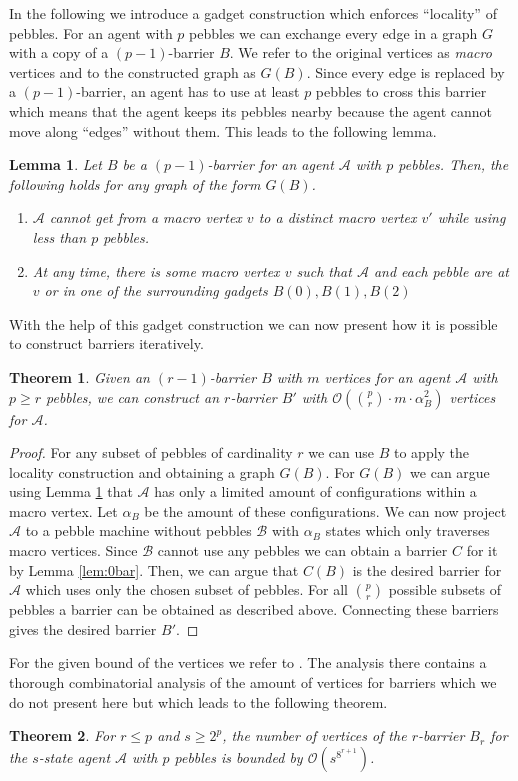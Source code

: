 \documentclass[oneside]{scrartcl}
\newtheorem{thm}{Theorem}
\newtheorem{lem}{Lemma}
\begin{document}
In the following we introduce a gadget construction which enforces
\enquote{locality} of pebbles. For an agent with $p$ pebbles we can exchange
every edge in a graph $G$ with a copy of a $(p-1)$-barrier $B$. We refer to the
original vertices as \emph{macro} vertices and to the constructed graph as
$G(B)$.  Since every edge is replaced by a $(p-1)$-barrier, an agent has to use
at least $p$ pebbles to cross this barrier which means that the agent keeps its
pebbles nearby because the agent cannot move along \enquote{edges} without
them. This leads to the following lemma.
\begin{lem}
  \label{lem:loc}
  Let $B$ be a $(p-1)$-barrier for an agent $\mathcal{A}$ with $p$ pebbles.
  Then, the following holds for any graph of the form $G(B)$.
  \begin{enumerate}
    \item $\mathcal{A}$ cannot get from a macro vertex $v$ to a distinct
      macro vertex $v'$ while using less than $p$ pebbles.
    \item At any time, there is some macro vertex $v$ such that $\mathcal{A}$
      and each pebble are at $v$ or in one of the surrounding gadgets $B(0),
      B(1), B(2)$
  \end{enumerate}
\end{lem}

With the help of this gadget construction we can now present how it is possible
to construct barriers iteratively.
\begin{thm}
  Given an $(r-1)$-barrier $B$ with $m$ vertices for an agent $\mathcal{A}$
  with $p\geq r$ pebbles, we can construct an $r$-barrier $B'$ with
  $\mathcal{O}({{p}\choose{r}}\cdot m\cdot \alpha_{B}^{2})$ vertices for
  $\mathcal{A}$.
\end{thm}
\begin{proof}
  For any subset of pebbles of cardinality $r$ we can use $B$ to apply the
  locality construction and obtaining a graph $G(B)$. For $G(B)$ we can argue
  using Lemma \ref{lem:loc} that $\mathcal{A}$ has only a limited
  amount of configurations within a macro vertex. Let $\alpha_{B}$ be the
  amount of these configurations. We can now project $\mathcal{A}$ to a pebble
  machine without pebbles $\mathcal{B}$ with $\alpha_{B}$ states which only
  traverses macro vertices. Since $\mathcal{B}$ cannot use any pebbles we can
  obtain a barrier $C$ for it by Lemma \ref{lem:0bar}. Then, we can argue that
  $C(B)$ is the desired barrier for $\mathcal{A}$ which uses only the chosen
  subset of pebbles. For all ${p}\choose{r}$ possible subsets of pebbles a
  barrier can be obtained as described above. Connecting these barriers gives
  the desired barrier $B'$.
\end{proof}
For the given bound of the vertices we refer to \cite{pebbles}. The
analysis there contains a thorough combinatorial analysis of the amount of
vertices for barriers which we do not present here but which leads to the
following theorem.
\begin{thm}
  For $r\leq p$ and $s \geq 2^{p}$, the number of vertices of the $r$-barrier
  $B_{r}$ for the $s$-state agent $\mathcal{A}$ with $p$ pebbles is bounded by
  $\mathcal{O}(s^{8^{r+1}})$.
\end{thm}
\end{document}
